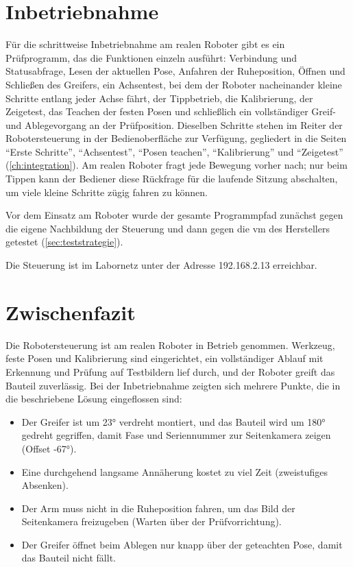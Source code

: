 \section{Inbetriebnahme}
\label{sec:m2-inbetriebnahme}

Für die schrittweise Inbetriebnahme am realen Roboter gibt es ein Prüfprogramm, das die
Funktionen einzeln ausführt: Verbindung und Statusabfrage, Lesen der aktuellen Pose, Anfahren
der Ruheposition, Öffnen und Schließen des Greifers, ein Achsentest, bei dem der Roboter
nacheinander kleine Schritte entlang jeder Achse fährt, der Tippbetrieb, die Kalibrierung,
der Zeigetest, das Teachen der festen Posen und schließlich ein vollständiger Greif- und
Ablegevorgang an der Prüfposition. Dieselben Schritte stehen im Reiter der Robotersteuerung in
der Bedienoberfläche zur Verfügung, gegliedert in die Seiten \enquote{Erste Schritte},
\enquote{Achsentest}, \enquote{Posen teachen}, \enquote{Kalibrierung} und
\enquote{Zeigetest} (\cref{ch:integration}). Am realen Roboter fragt jede Bewegung vorher
nach; nur beim Tippen kann der Bediener diese Rückfrage für die laufende Sitzung abschalten,
um viele kleine Schritte zügig fahren zu können.

Vor dem Einsatz am Roboter wurde der gesamte Programmpfad zunächst gegen die eigene
Nachbildung der Steuerung und dann gegen die \ac{vm} des Herstellers getestet
(\cref{sec:teststrategie}).

Die Steuerung ist im Labornetz unter der Adresse 192.168.2.13 erreichbar.

\section{Zwischenfazit}

Die Robotersteuerung ist am realen Roboter in Betrieb genommen. Werkzeug, feste Posen und
Kalibrierung sind eingerichtet, ein vollständiger Ablauf mit Erkennung und Prüfung auf
Testbildern lief durch, und der Roboter greift das Bauteil zuverlässig. Bei der
Inbetriebnahme zeigten sich mehrere Punkte, die in die beschriebene Lösung eingeflossen sind:
\begin{itemize}
  \item Der Greifer ist um \ang{23} verdreht montiert, und das Bauteil wird um \ang{180} gedreht
        gegriffen, damit Fase und Seriennummer zur Seitenkamera zeigen (Offset \ang{-67}).
  \item Eine durchgehend langsame Annäherung kostet zu viel Zeit (zweistufiges Absenken).
  \item Der Arm muss nicht in die Ruheposition fahren, um das Bild der Seitenkamera
        freizugeben (Warten über der Prüfvorrichtung).
  \item Der Greifer öffnet beim Ablegen nur knapp über der geteachten Pose, damit das Bauteil
        nicht fällt.
\end{itemize}

